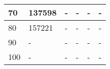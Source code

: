\begin{table}[h]
\begin{tabular}{|l|l|l|l|l|l|}
70                                                                         & 137598                               & -                                     & -                                     & -                                     & -                                     \\ \hline
80                                                                         & 157221                               & -                                     & -                                     & -                                     & -                                     \\ \hline
90                                                                         & -                                    & -                                     & -                                     & -                                     & -                                     \\ \hline
100                                                                        & -                                    & -                                     & -                                     & -                                     & -                                     \\ \hline
\end{tabular}
\end{table}


